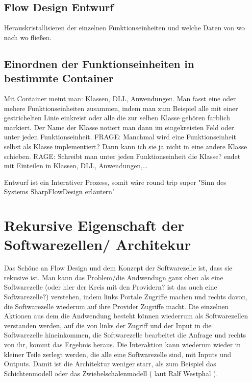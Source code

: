 \documentclass[11pt]{article}
\begin{document}
\subsection{Flow Design Entwurf}
\label{sec:orgheadline47}
Herauskristallisieren der einzelnen Funktionseinheiten und welche Daten von wo nach wo fließen.

\subsection{Einordnen der Funktionseinheiten in bestimmte Container}
\label{sec:orgheadline48}
Mit Container meint man: Klassen, DLL, Anwendungen.
Man fasst eine oder mehere Funktionseinheiten zusammen, indem man zum Beispiel alle mit einer gestrichelten Linie einkreist oder alle die zur selben Klasse
gehören farblich markiert. Der Name der Klasse notiert man dann im eingekreisten Feld oder unter jeden Funktionseinheit.
FRAGE: Manchmal wird eine Funktionseinheit selbst als Klasse implementiert? Dann kann ich sie ja nicht in eine andere Klasse schieben.
RAGE: Schreibt man unter jeden Funktionseinheit die Klasse?
  endet mit Einteilen in Klassen, DLL, Anwendungen,\ldots{}

Entwurf ist ein Interativer Prozess, somit wäre round trip super "Sinn des Systems SharpFlowDesign erläutern"



\section{Rekursive Eigenschaft der Softwarezellen/ Architekur}
\label{sec:orgheadline50}
Das Schöne an Flow Design und dem Konzept der Softwarezelle ist, dass sie rekusive ist.
Man kann das Problem/die Andwendugn ganz oben als eine Softwarezelle (oder hier der Kreis mit den Providern? ist das auch eine Softwarezelle?)
verstehen, indem links Portale Zugriffe machen und rechts davon, die Softwarezelle wiederum auf ihre Provider Zugriffe macht.
Die einzelnen Aktionen aus dem die Andwendung besteht können wiederrum als Softwarezellen verstanden werden, auf die von links 
der Zugriff und der Input in die Softwarezelle hineinkommen, die Softwarezelle bearbeitet die Anfrage und rechts von ihr, kommt das
Ergebnis heraus. Die Interaktion kann wiederum wieder in kleiner Teile zerlegt werden, die alle eine Softwarezelle sind, mit Inputs und
Outputs. Damit ist die Architektur weniger starr, als zum Beispiel das Schichtenmodell oder das Zwiebelschalenmodell ( laut Ralf Westphal ). 
\end{document}
